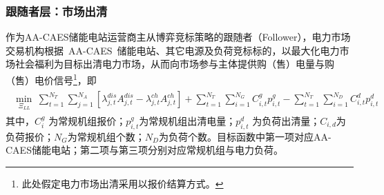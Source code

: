 \subsubsection{跟随者层：市场出清}
作为AA-CAES储能电站运营商主从博弈竞标策略的跟随者（Follower），电力市场交易机构根据~AA-CAES~储能电站、其它电源及负荷竞标标的，以最大化电力市场社会福利为目标出清电力市场，从而向市场参与主体提供购（售）电量与购（售）电价信号\footnote{此处假定电力市场出清采用以报价结算方式。}，即
\begin{eqnarray}
\label{equ:aa-caes-pab-follow-obj}
\begin{array}{l}
\mathop {\min \;}\limits_{{\Xi _{LL}}\;} \sum\limits_{t = 1}^{{N_T}} {\sum\limits_{j = 1}^{{N_A}} {\left[ {\lambda _{j,t}^{dis}A_{j,t}^{dis} - \lambda _{j,t}^{ch}A_{j,t}^{ch}} \right]} } + \sum\limits_{t = 1}^{{N_T}} {\sum\limits_{i = 1}^{{N_G}} {C_{i,t}^gp_{i,t}^g} }  - \sum\limits_{t = 1}^{{N_T}} {\sum\limits_{i = 1}^{{N_D}} {C_{i,t}^dp_{i,t}^d} }
\end{array}
\end{eqnarray}
其中，$C_i^g$ 为常规机组报价；$p_{i,t}^g$为常规机组出清电量；$p_{i,t}^d$ 为负荷出清量；$C_{i,d}$为负荷报价；$N_G$为常规机组个数；$N_D$为负荷个数。目标函数中第一项对应AA-CAES储能电站；第二项与第三项分别对应常规机组与电力负荷。


